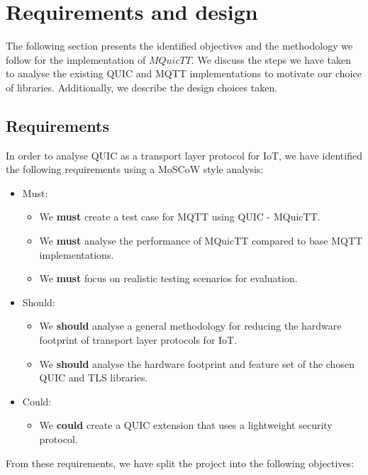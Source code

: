 \chapter{Requirements and design} \label{chap:reqs}

The following section presents the identified objectives and the methodology we follow for the implementation of $MQuicTT$.
We discuss the steps we have taken to analyse the existing QUIC and MQTT implementations to motivate our choice of libraries.
Additionally, we describe the design choices taken.

\section{Requirements}

In order to analyse QUIC as a transport layer protocol for IoT, we have identified the following requirements using a MoSCoW style analysis:

\begin{itemize}
    \item Must:
    \begin{itemize}
        \item We \textbf{must} create a test case for MQTT using QUIC - MQuicTT.
        \item We \textbf{must} analyse the performance of MQuicTT compared to base MQTT implementations.
        \item We \textbf{must} focus on realistic testing scenarios for evaluation.
    \end{itemize}
    \item Should:
    \begin{itemize}
        \item We \textbf{should} analyse a general methodology for reducing the hardware footprint of transport layer protocols for IoT.
        \item We \textbf{should} analyse the hardware footprint and feature set of the chosen QUIC and TLS libraries.
    \end{itemize}
    \item Could:
    \begin{itemize}
        \item We \textbf{could} create a QUIC extension that uses a lightweight security protocol.
    \end{itemize}
\end{itemize}

From these requirements, we have split the project into the following objectives:

